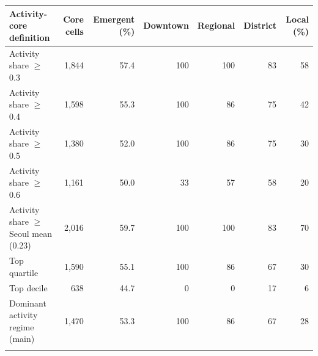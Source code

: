 \begin{tabular}{lrrrrrr}
\toprule
Activity-core definition & Core cells & Emergent (\%) & Downtown & Regional & District & Local (\%) \\
\midrule
Activity share $\geq$ 0.3 & 1{,}844 & 57.4 & 100 & 100 & 83 & 58 \\
Activity share $\geq$ 0.4 & 1{,}598 & 55.3 & 100 & 86 & 75 & 42 \\
Activity share $\geq$ 0.5 & 1{,}380 & 52.0 & 100 & 86 & 75 & 30 \\
Activity share $\geq$ 0.6 & 1{,}161 & 50.0 & 33 & 57 & 58 & 20 \\
Activity share $\geq$ Seoul mean (0.23) & 2{,}016 & 59.7 & 100 & 100 & 83 & 70 \\
Top quartile & 1{,}590 & 55.1 & 100 & 86 & 67 & 30 \\
Top decile & 638 & 44.7 & 0 & 0 & 17 & 6 \\
Dominant activity regime (main) & 1{,}470 & 53.3 & 100 & 86 & 67 & 28 \\
\botrule
\end{tabular}
